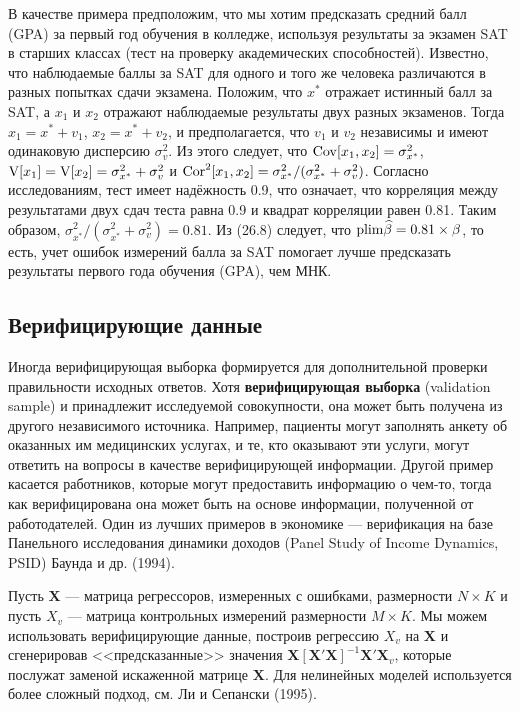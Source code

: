 В качестве примера предположим, что мы хотим предсказать средний  балл (GPA) за первый год обучения в колледже, используя результаты за экзамен SAT в старших классах (тест на проверку академических способностей). Известно, что наблюдаемые баллы за SAT для одного и того же человека различаются в разных попытках сдачи экзамена. Положим, что $x^*$ отражает истинный балл за SAT, а $x_1$ и $x_2$ отражают наблюдаемые результаты двух разных экзаменов. Тогда $x_1=x^*+v_1$, $x_2=x^*+v_2$, и предполагается, что $v_1$ и $v_2$ независимы и имеют одинаковую дисперсию $\sigma^2_v$. Из этого следует, что $\mathrm{Cov}[x_1, x_2]=\sigma^2_{x^*}$, $\mathrm{V}[x_1]=\mathrm{V}[x_2]=\sigma^2_{x^*}+\sigma^2_v$ и $\mathrm{Cor}^2[x_1,x_2]=\sigma^2_{x^*} / (\sigma^2_{x^*}+\sigma^2_v)$. Согласно исследованиям, тест имеет надёжность 0.9, что означает, что корреляция между результатами двух сдач теста равна 0.9 и квадрат корреляции равен 0.81. Таким образом, $\sigma^2_{x^*} / (\sigma^2_{x^*}+\sigma^2_v)=0.81$. Из (26.8) следует, что $\mathrm{plim } \widehat{\beta}=0.81 \times \beta$, то есть, учет ошибок измерений балла за SAT помогает лучше предсказать результаты первого года обучения (GPA), чем МНК.

\subsection{Верифицирующие данные} 
Иногда верифицирующая выборка формируется для дополнительной проверки правильности исходных ответов. Хотя {\bf верифицирующая выборка} (validation sample) и принадлежит исследуемой совокупности, она может быть получена из другого независимого источника. Например, пациенты могут заполнять анкету об оказанных им медицинских услугах, и те, кто оказывают эти услуги, могут ответить на вопросы в качестве верифицирующей информации. Другой пример касается работников, которые могут предоставить информацию о чем-то, тогда как верифицирована она может быть на основе информации, полученной от работодателей. Один из лучших примеров в экономике –-- верификация на базе Панельного исследования динамики доходов (Panel Study of Income Dynamics, PSID) Баунда и др. (1994).

Пусть $\mathbf{X}$ –-- матрица регрессоров, измеренных с ошибками, размерности $N \times K$  и пусть $X_v$ –-- матрица контрольных измерений размерности $M \times K$. Мы можем использовать верифицирующие данные, построив регрессию $X_v$ на $\mathbf{X}$ и сгенерировав <<предсказанные>> значения $\mathbf{X[X'X]}^{-1} \mathbf{X'X}_v$, которые послужат заменой искаженной матрице $\mathbf{X}$. Для нелинейных моделей используется более сложный подход, см. Ли и Сепански (1995).

